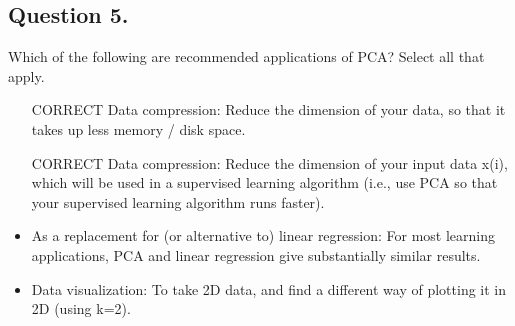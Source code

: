 \documentclass[11pt]{article} %
\begin{document}
\subsection{ Question 5. }
Which of the following are recommended applications of PCA? Select all that apply.

\begin{itemize}
	\item [CORRECT] Data compression: Reduce the dimension of your data, so that it takes up less memory / disk space.
	
	\item [CORRECT] Data compression: Reduce the dimension of your input data x(i), which will be used in a supervised learning algorithm (i.e., use PCA so that your supervised learning algorithm runs faster).
	
	\item As a replacement for (or alternative to) linear regression: For most learning applications, PCA and linear regression give substantially similar results.
	
	\item Data visualization: To take 2D data, and find a different way of plotting it in 2D (using k=2).
	
\end{itemize}
\end{document}
